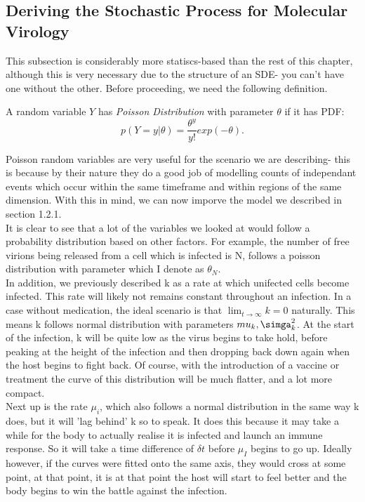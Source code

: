 \subsection{Deriving the Stochastic Process for Molecular Virology}

This subsection is considerably more statiscs-based than the rest of this chapter, although this is very necessary due to the structure of an SDE- you can't have one without the other. Before proceeding, we need the following definition.

\begin{definition}
    A random variable $Y$ has  \textit{Poisson Distribution} with parameter $\theta$ if it has PDF:
     \[
         p(Y=y | \theta) = \frac{\theta^y}{y!}exp(-\theta) 
    .\] 
\end{definition}

Poisson random variables are very useful for the scenario we are describing- this is because by their nature they do a good job of modelling counts of independant events which occur within the same timeframe and within regions of the same dimension. With this in mind, we can now imporve the model we described in section 1.2.1.\\

It is clear to see that a lot of the variables we looked at would follow a probability distribution based on other factors. For example, the number of free virions being released from a cell which is infected is N, follows a poisson distribution with parameter which I denote as $\theta_N$. \\ 

In addition, we previously described k as a rate at which unifected cells become infected. This rate will likely not remains constant throughout an infection. In a case without medication, the ideal scenario is that $\lim_{t\to \infty}k = 0$ naturally. This means k follows normal distribution with parameters $mu_k, \simga^2_k$. At the start of the infection, k will be quite low as the virus begins to take hold, before peaking at the height of the infection and then dropping back down again when the host begins to fight back. Of course, with the introduction of a vaccine or treatment the curve of this distribution will be much flatter, and a lot more compact. \\ 

Next up is the rate $\mu_i$, which also follows a normal distribution in the same way k does, but it will 'lag behind' k so to speak. It does this because it may take a while for the body to actually realise it is infected and launch an immune response. So it will take a time difference of $\delta t$ before  $\mu_I$ begins to go up. Ideally however, if the curves were fitted onto the same axis, they would cross at some point, at that point, it is at that point the host will start to feel better and the body begins to win the battle against the infection. \\

